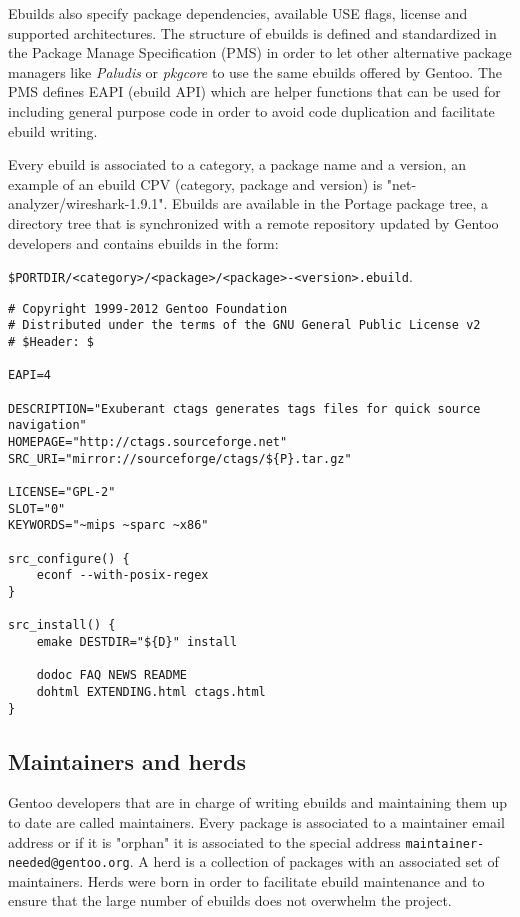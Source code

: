 Ebuilds also specify package dependencies, available USE flags, license and supported architectures.
The structure of ebuilds is defined and standardized in the Package Manage Specification (PMS) \cite{gentoo_pms} in order to let other alternative package managers like \emph{Paludis} or \emph{pkgcore} to use the same ebuilds offered by Gentoo. The PMS defines EAPI (ebuild API) which are helper functions that can be used for including general purpose code in order to avoid code duplication and facilitate ebuild writing.

Every ebuild is associated to a category, a package name and a version, an example of an ebuild CPV (category, package and version) is "net-analyzer/wireshark-1.9.1".
Ebuilds are available in the Portage package tree, a directory tree that is synchronized with a remote repository updated by Gentoo developers and contains ebuilds in the form:

\texttt{\$PORTDIR/<category>/<package>/<package>-<version>.ebuild}.


\vspace{0.5cm}
\lstset{language=bash, caption=Simplified ebuild for "Exuberant ctags", label=Example of an ebuild, numbers=left, stepnumber=2, frame=single, breaklines=true}
\begin{lstlisting}
# Copyright 1999-2012 Gentoo Foundation
# Distributed under the terms of the GNU General Public License v2
# $Header: $

EAPI=4

DESCRIPTION="Exuberant ctags generates tags files for quick source navigation"
HOMEPAGE="http://ctags.sourceforge.net"
SRC_URI="mirror://sourceforge/ctags/${P}.tar.gz"

LICENSE="GPL-2"
SLOT="0"
KEYWORDS="~mips ~sparc ~x86"

src_configure() {
    econf --with-posix-regex
}

src_install() {
    emake DESTDIR="${D}" install

    dodoc FAQ NEWS README
    dohtml EXTENDING.html ctags.html
}
\end{lstlisting}
\vspace{0.5cm}


\subsection{Maintainers and herds}
Gentoo developers that are in charge of writing ebuilds and maintaining them up to date are called maintainers. Every package is associated to a maintainer email address or if it is "orphan" it is associated to the special address \texttt{maintainer-needed@gentoo.org}.
A herd is a collection of packages with an associated set of maintainers. Herds were born in order to facilitate ebuild maintenance and to ensure that the large number of ebuilds does not overwhelm the project.


